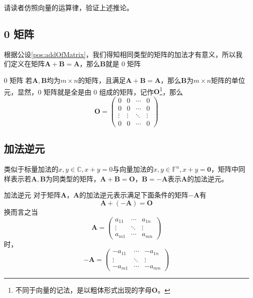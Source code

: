 请读者仿照向量的运算律，验证上述推论。

\subsection{0 矩阵}

根据公设\ref{pos:addOfMatrix}，我们得知相同类型的矩阵的加法才有意义，所以我们定义在矩阵$\mathbf{A}+\mathbf{B}=\mathbf{A}$，那么$\mathbf{B}$就是 0 矩阵

\begin{definition}{0 矩阵}
	若$\mathbf{A},\mathbf{B}$均为$m\times n$的矩阵，且满足$\mathbf{A}+\mathbf{B}=\mathbf{A}$，那么$\mathbf{B}$为$m\times n$矩阵的单位元，显然，0 矩阵就是全是由 0 组成的矩阵，记作$\mathbf{O}$\footnote{不同于向量的记法，是以粗体形式出现的字母$\mathbf{O}$。}，那么$$
	\mathbf{O}  = \begin{pmatrix}  
		0 & 0 & \cdots & 0 \\  
		0 & 0 & \cdots & 0 \\  
		\vdots & \vdots & \ddots & \vdots \\  
		0 & 0 & \cdots & 0  
	  \end{pmatrix} 
	$$
\end{definition}

\subsection{加法逆元}

类似于标量加法的$x,y\in \mathbb{C},x+y=0$与向量加法的$x,y\in \mathbb{F}^n,x+y=\boldsymbol{0}$，矩阵中同样表示若$\mathbf{A},\mathbf{B}$为同类型的矩阵，$\mathbf{A}+\mathbf{B}=\boldsymbol{O}$，$\mathbf{B}=-\mathbf{A}$表示$\mathbf{A}$的加法逆元。

\begin{definition}{加法逆元}
	对于矩阵$\mathbf{A}$，$\mathbf{A}$的加法逆元表示满足下面条件的矩阵$-\mathbf{A}$有$$\mathbf{A}+(-\mathbf{A})=\boldsymbol{O}$$换而言之当$$\mathbf{A}=\begin{pmatrix}  
		a_{11} & \cdots & a_{1n} \\  
		\vdots & \ddots & \vdots \\  
		a_{m1} & \cdots & a_{mn}  
	  \end{pmatrix} $$时，$$-\mathbf{A}=\begin{pmatrix}  
		-a_{11} & \cdots & -a_{1n} \\  
		\vdots & \ddots & \vdots \\  
		-a_{m1} & \cdots & -a_{mn}  
	  \end{pmatrix} $$
\end{definition}

